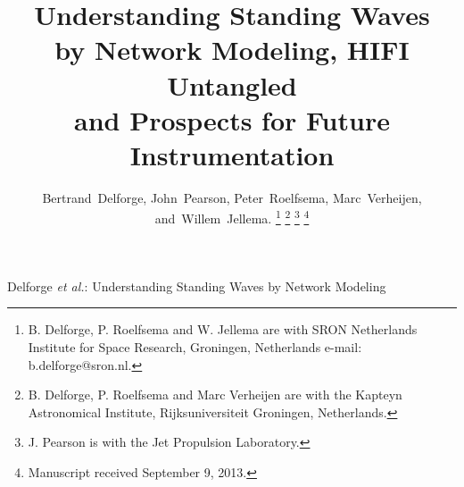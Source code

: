 \documentclass[journal]{IEEEtran}
\begin{document}
%
\title{Understanding Standing Waves\\by Network Modeling, HIFI Untangled\\and Prospects for Future Instrumentation}
%
%
%

\author{Bertrand~Delforge,
        John~Pearson,
        Peter~Roelfsema,
        Marc~Verheijen,
        and~Willem~Jellema.%
\thanks{B. Delforge, P. Roelfsema and W. Jellema are with SRON Netherlands Institute for Space Research, Groningen, Netherlands e-mail: b.delforge@sron.nl.}%
\thanks{B. Delforge, P. Roelfsema and Marc Verheijen are with the Kapteyn Astronomical Institute, Rijksuniversiteit Groningen, Netherlands.}%
\thanks{J. Pearson is with the Jet Propulsion Laboratory.}%
\thanks{Manuscript received September 9, 2013.}}


% 
%



%
{Delforge \MakeLowercase{\textit{et al.}}: Understanding Standing Waves by Network Modeling}
% 
\end{document}
